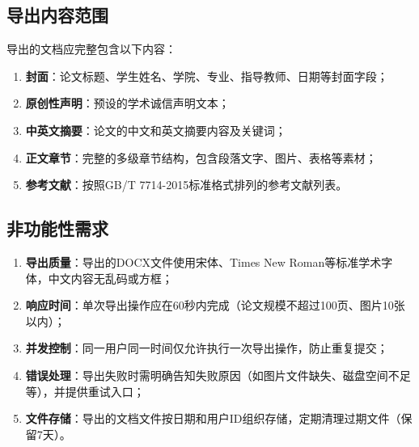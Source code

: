 \subsection{导出内容范围}

导出的文档应完整包含以下内容：

\begin{enumerate}
    \item \textbf{封面}：论文标题、学生姓名、学院、专业、指导教师、日期等封面字段；
    \item \textbf{原创性声明}：预设的学术诚信声明文本；
    \item \textbf{中英文摘要}：论文的中文和英文摘要内容及关键词；
    \item \textbf{正文章节}：完整的多级章节结构，包含段落文字、图片、表格等素材；
    \item \textbf{参考文献}：按照GB/T 7714-2015标准格式排列的参考文献列表。
\end{enumerate}

\subsection{非功能性需求}

\begin{enumerate}
    \item \textbf{导出质量}：导出的DOCX文件使用宋体、Times New Roman等标准学术字体，中文内容无乱码或方框；
    \item \textbf{响应时间}：单次导出操作应在60秒内完成（论文规模不超过100页、图片10张以内）；
    \item \textbf{并发控制}：同一用户同一时间仅允许执行一次导出操作，防止重复提交；
    \item \textbf{错误处理}：导出失败时需明确告知失败原因（如图片文件缺失、磁盘空间不足等），并提供重试入口；
    \item \textbf{文件存储}：导出的文档文件按日期和用户ID组织存储，定期清理过期文件（保留7天）。
\end{enumerate}
